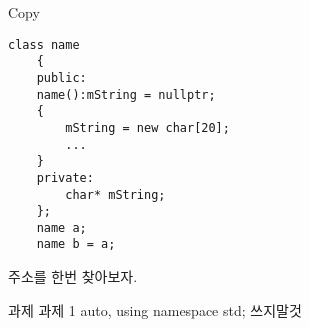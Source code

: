 \documentclass[10pt]{beamer}
\begin{document}
\begin{frame}[fragile]{Copy}
    \begin{lstlisting}[style = CStyle]
    class name
    {
    public:
    name():mString = nullptr;
    {
        mString = new char[20];
        ...
    }
    private:
        char* mString;
    };
    name a;
    name b = a;
    \end{lstlisting}
        주소를 한번 찾아보자.
\end{frame}



\begin{frame}[fragile]{move (C++11)}}
    \begin{itemize}
        \item rvalue vs lvalue
        \item 너무 어려워요
        \item 필요하면 그때..
    \end{itemize}
    \begin{lstlisting}[style = CStyle]
        name a ,b;
        ...
        name c = a*b;
    \end{lstlisting}
\end{frame}

\begin{frame}{과제}
    과제 1
    auto, using namespace std; 쓰지말것
\end{frame}    
\end{document}
